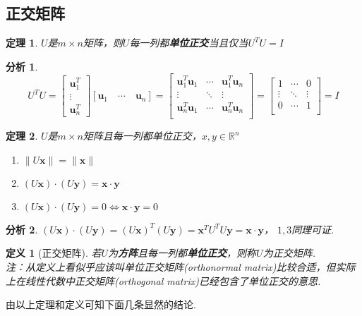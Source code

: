 \documentclass[11pt,UTF8]{ctexart}
\newtheorem{theorem}{定理}
\newtheorem{definition}{定义}
\newtheorem*{analysis}{分析}
\newcommand{\vb}[1]{\mathbf{#1}}
\begin{document}
\subsection{正交矩阵}
\begin{theorem}
$U$是$m\times n$矩阵，则$U$每一列都\textbf{单位正交}当且仅当$U^TU=I$
\end{theorem}
\begin{analysis}
\[U^TU=\begin{bmatrix}\vb{u}_1^T\\\vdots\\\vb{u}_n^T\end{bmatrix}[\vb{u}_1\quad\cdots\quad\vb{u}_n]
=\begin{bmatrix}\vb{u}_1^T\vb{u}_1 & \cdots & \vb{u}_1^T\vb{u}_n\\
\vdots&\ddots&\vdots\\
\vb{u}_n^T\vb{u}_1 & \cdots & \vb{u}_n^T\vb{u}_n\\\end{bmatrix}
=\begin{bmatrix}1 & \cdots & 0\\
\vdots&\ddots&\vdots\\
0 & \cdots & 1\\\end{bmatrix}=I\]
\end{analysis}
\begin{theorem}
$U$是$m\times n$矩阵且每一列都单位正交，$x,y\in\mathbb{R}^n$
\begin{enumerate}
	\itemsep -3pt
	\item $\|U\mathbf{x}\|=\|\mathbf{x}\|$
	\item $(U\mathbf{x})\cdot(U\mathbf{y})=\mathbf{x}\cdot\mathbf{y}$
	\item $(U\mathbf{x})\cdot(U\mathbf{y})=0\iff\mathbf{x}\cdot\mathbf{y}=0$
\end{enumerate}
\end{theorem}
\begin{analysis}
$(U\mathbf{x})\cdot(U\mathbf{y})=(U\mathbf{x})^T(U\mathbf{y})=\mathbf{x}^TU^TU\mathbf{y}=\mathbf{x}\cdot\mathbf{y}$，
$1,3$同理可证.
\end{analysis}
\begin{definition}[正交矩阵]
若$U$为\textbf{方阵}且每一列都\textbf{单位正交}，则称$U$为正交矩阵.\\
注：从定义上看似乎应该叫单位正交矩阵(orthonormal matrix)比较合适，但实际上在线性代数中正交矩阵(orthogonal matrix)已经包含了单位正交的意思.
\end{definition}
由以上定理和定义可知下面几条显然的结论.
\end{document}
